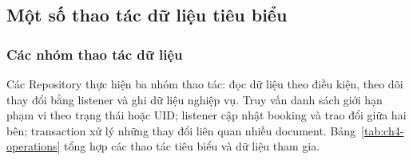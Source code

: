 \subsection{Một số thao tác dữ liệu tiêu biểu}
\label{sec:ch4-operations}

\subsubsection{Các nhóm thao tác dữ liệu}

Các Repository thực hiện ba nhóm thao tác: đọc dữ liệu theo điều kiện, theo dõi thay đổi bằng listener và ghi dữ liệu nghiệp vụ. Truy vấn danh sách giới hạn phạm vi theo trạng thái hoặc UID; listener cập nhật booking và trao đổi giữa hai bên; transaction xử lý những thay đổi liên quan nhiều document. Bảng~\ref{tab:ch4-operations} tổng hợp các thao tác tiêu biểu và dữ liệu tham gia.

